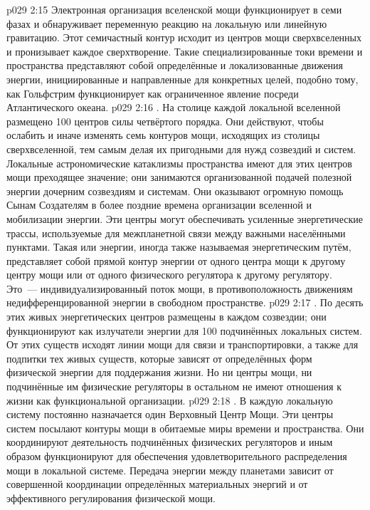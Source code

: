 \vs p029 2:15 Электронная организация вселенской мощи функционирует в семи фазах и обнаруживает переменную реакцию на локальную или линейную гравитацию. Этот семичастный контур исходит из центров мощи сверхвселенных и пронизывает каждое сверхтворение. Такие специализированные токи времени и пространства представляют собой определённые и локализованные движения энергии, инициированные и направленные для конкретных целей, подобно тому, как Гольфстрим функционирует как ограниченное явление посреди Атлантического океана.
\vs p029 2:16 . На столице каждой локальной вселенной размещено 100 центров силы четвёртого порядка. Они действуют, чтобы ослабить и иначе изменять семь контуров мощи, исходящих из столицы сверхвселенной, тем самым делая их пригодными для нужд созвездий и систем. Локальные астрономические катаклизмы пространства имеют для этих центров мощи преходящее значение; они занимаются организованной подачей полезной энергии дочерним созвездиям и системам. Они оказывают огромную помощь Сынам Создателям в более поздние времена организации вселенной и мобилизации энергии. Эти центры могут обеспечивать усиленные энергетические трассы, используемые для межпланетной связи между важными населёнными пунктами. Такая  или  энергии, иногда также называемая энергетическим путём, представляет собой прямой контур энергии от одного центра мощи к другому центру мощи или от одного физического регулятора к другому регулятору. Это~--- индивидуализированный поток мощи, в противоположность движениям недифференцированной энергии в свободном пространстве.
\vs p029 2:17 . По десять этих живых энергетических центров размещены в каждом созвездии; они функционируют как излучатели энергии для 100 подчинённых локальных систем. От этих существ исходят линии мощи для связи и транспортировки, а также для подпитки тех живых существ, которые зависят от определённых форм физической энергии для поддержания жизни. Но ни центры мощи, ни подчинённые им физические регуляторы в остальном не имеют отношения к жизни как функциональной организации.
\vs p029 2:18 . В каждую локальную систему постоянно назначается один Верховный Центр Мощи. Эти центры систем посылают контуры мощи в обитаемые миры времени и пространства. Они координируют деятельность подчинённых физических регуляторов и иным образом функционируют для обеспечения удовлетворительного распределения мощи в локальной системе. Передача энергии между планетами зависит от совершенной координации определённых материальных энергий и от эффективного регулирования физической мощи.
